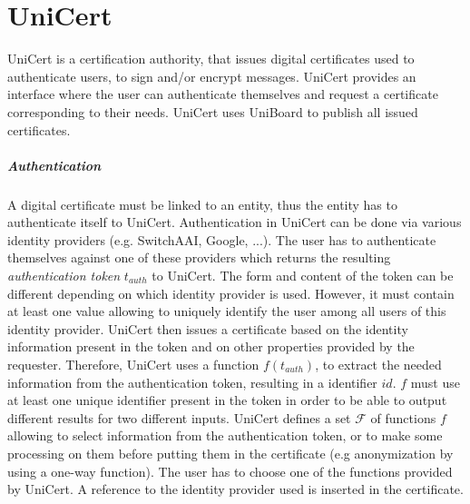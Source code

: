\documentclass[bibtotoc,halfparskip,oneside]{scrreprt}
\begin{document}
\chapter{UniCert}

UniCert is a certification authority, that issues digital certificates used to authenticate users, to sign and/or encrypt messages. UniCert provides an interface where the user can authenticate themselves and request a certificate corresponding to their needs. UniCert uses UniBoard to publish all issued certificates.

\paragraph*{Authentication} A digital certificate must be linked to an entity, thus the entity has to authenticate itself to UniCert. Authentication in UniCert can be done via various identity providers (e.g. SwitchAAI, Google, ...). The user has to authenticate themselves against one of these providers which returns the resulting \emph{authentication token} $t_{auth}$ to UniCert. The form and content of the token can be different depending on which identity provider is used. However, it must contain at least one value allowing to uniquely identify the user among all users of this identity provider.
UniCert then issues a certificate based on the identity information present in the token and on other properties provided by the requester.  Therefore, UniCert uses a function $\mathit{f}(t_{auth})$, to extract the needed information from the authentication token, resulting in a identifier $id$. $\mathit{f}$ must use at least one unique identifier present in the token in order to be able to output different results for two different inputs. UniCert defines a set $\mathcal{F}$ of functions $\mathit{f}$ allowing to select information from the authentication token, or to make some processing on them before putting them in the certificate (e.g anonymization by using a one-way function). The user has to choose one of the functions provided by UniCert. A reference to the identity provider used is inserted in the certificate.
\end{document}
